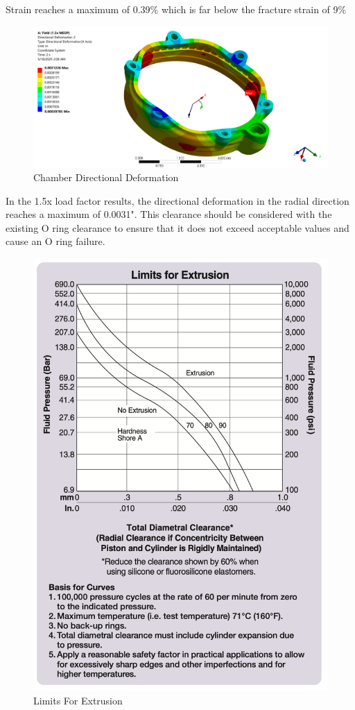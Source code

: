  Strain reaches a maximum of 0.39\% which is far below the fracture strain of 9\% 
\begin{figure}
    \centering
    \includegraphics[width=1\linewidth]{Images/Chamber Directional Deformation.png}
    \caption{Chamber Directional Deformation}
    \label{fig:Chamber Directional Deformation}
\end{figure}
In the 1.5x load factor  results, the directional deformation in the radial direction reaches a maximum of 0.0031". This clearance should be considered with the existing O ring clearance to ensure that it does not exceed acceptable values and cause an O ring failure. 
\begin{figure}
    \centering
    \includegraphics[width=1\linewidth]{Images/Limits For Extrusion.png}
    \caption{Limits For Extrusion}
    \label{fig:Limits For Extrusion}
\end{figure}

